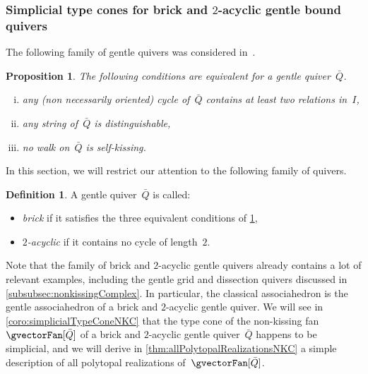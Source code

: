 \documentclass{amsart}
\newtheorem{proposition}[theorem]{Proposition}
\theoremstyle{definition}
\newtheorem{definition}[theorem]{Definition}
\newcommand{\darkblue}{\color{darkblue}} %
\newcommand{\defn}[1]{\textsl{\darkblue #1}} %
\newcommand{\quiver}{\bar Q} %
\begin{document}

\subsubsection{Simplicial type cones for brick and $2$-acyclic gentle bound quivers}
\label{subsubsec:simplicialTypeConeNKC}

The following family of gentle quivers was considered in~\cite[Sect.~4]{GarverMcConvilleMousavand}.

\begin{proposition}
\label{prop:noSelfKissing}
The following conditions are equivalent for a gentle quiver~$\quiver$.
\begin{enumerate}[(i)]
\item any (non necessarily oriented) cycle of~$\quiver$ contains at least two relations in~$I$,
\item any string of~$\quiver$ is distinguishable,
\item no walk on~$\quiver$ is self-kissing.
\end{enumerate}
\end{proposition}

In this section, we will restrict our attention to the following family of quivers.

\begin{definition}
\label{def:brick2acyclic}
A gentle quiver~$\quiver$ is called:
\begin{itemize}
\item \defn{brick} if it satisfies the three equivalent conditions of \cref{prop:noSelfKissing},
\item \defn{$2$-acyclic} if it contains no cycle of length~$2$.
\end{itemize}
\end{definition}

Note that the family of brick and $2$-acyclic gentle quivers already contains a lot of relevant examples, including the gentle grid and dissection quivers discussed in \cref{subsubsec:nonkissingComplex}.
In particular, the classical associahedron is the gentle associahedron of a brick and $2$-acyclic gentle quiver.
We will see in \cref{coro:simplicialTypeConeNKC} that the type cone of the non-kissing fan~$\gvectorFan[\quiver]$ of a brick and $2$-acyclic gentle quiver~$\quiver$ happens to be simplicial, and we will derive in \cref{thm:allPolytopalRealizationsNKC} a simple description of all polytopal realizations of~$\gvectorFan[\quiver]$.
\end{document}
